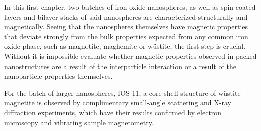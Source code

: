 \documentclass[\main/dresen_thesis.tex]{subfiles}
\begin{document}
  In this first chapter, two batches of iron oxide nanospheres, as well as spin-coated layers and bilayer stacks of said nanospheres are characterized structurally and magnetically.
  Seeing that the nanospheres themselves have magnetic properties that deviate strongly from the bulk properties expected from any common iron oxide phase, such as magnetite, maghemite or w\"ustite, the first step is crucial.
  Without it is impossible evaluate whether magnetic properties observed in packed nanostructures are a result of the interparticle interaction or a result of the nanoparticle properties themselves.

  For the batch of larger nanospheres, IOS-11, a core-shell structure of w\"ustite-magnetite is observed by complimentary small-angle scattering and X-ray diffraction experiments, which have their results confirmed by electron microscopy and vibrating sample magnetometry.
\end{document}
